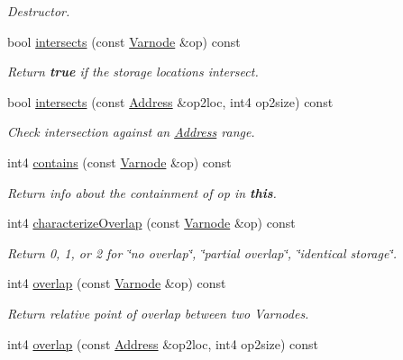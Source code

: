 \begin{DoxyCompactItemize}
\begin{DoxyCompactList}\small\item\em Destructor. \end{DoxyCompactList}\item 
bool \mbox{\hyperlink{class_varnode_a0750524b7c076892cf123c37b00db5af}{intersects}} (const \mbox{\hyperlink{class_varnode}{Varnode}} \&op) const
\begin{DoxyCompactList}\small\item\em Return {\bfseries{true}} if the storage locations intersect. \end{DoxyCompactList}\item 
bool \mbox{\hyperlink{class_varnode_a74edc3b590c862473137a27517d3777a}{intersects}} (const \mbox{\hyperlink{class_address}{Address}} \&op2loc, int4 op2size) const
\begin{DoxyCompactList}\small\item\em Check intersection against an \mbox{\hyperlink{class_address}{Address}} range. \end{DoxyCompactList}\item 
int4 \mbox{\hyperlink{class_varnode_afe43c9eba2e162f06ff29888db703d4d}{contains}} (const \mbox{\hyperlink{class_varnode}{Varnode}} \&op) const
\begin{DoxyCompactList}\small\item\em Return info about the containment of {\itshape op} in {\bfseries{this}}. \end{DoxyCompactList}\item 
int4 \mbox{\hyperlink{class_varnode_aadb56ff77a01d15e7a66f3a3851bf8e1}{characterize\+Overlap}} (const \mbox{\hyperlink{class_varnode}{Varnode}} \&op) const
\begin{DoxyCompactList}\small\item\em Return 0, 1, or 2 for \char`\"{}no overlap\char`\"{}, \char`\"{}partial overlap\char`\"{}, \char`\"{}identical storage\char`\"{}. \end{DoxyCompactList}\item 
int4 \mbox{\hyperlink{class_varnode_a3317ab5e04ef326f4c68ece1929539a6}{overlap}} (const \mbox{\hyperlink{class_varnode}{Varnode}} \&op) const
\begin{DoxyCompactList}\small\item\em Return relative point of overlap between two Varnodes. \end{DoxyCompactList}\item 
int4 \mbox{\hyperlink{class_varnode_a76b9fae2eedacde995415262b7e46189}{overlap}} (const \mbox{\hyperlink{class_address}{Address}} \&op2loc, int4 op2size) const

\end{DoxyCompactItemize}
